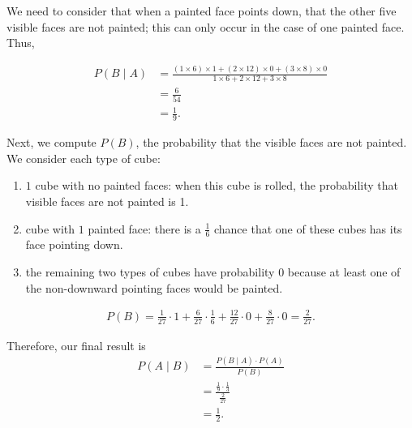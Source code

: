 \documentclass{article}
\theoremstyle{mytheoremstyle}
\theoremstyle{mytheoremstyle}
\theoremstyle{myproblemstyle}
\begin{document}
    We need to consider that when a painted face points down, that the other
    five visible faces are not painted; this can only occur in the case of one painted
    face. Thus,

    \begin{align*}
      P(B \mid A) &= \frac{(1\times 6) \times 1 + (2 \times 12) \times 0 + (3
      \times 8) \times  0}{1\times 6 + 2\times 12 + 3\times 8} \\
        &= \frac{6}{54} \\
        &= \frac{1}{9}.
    \end{align*}

    Next, we compute \( P (B) \), the probability that the visible faces are
    not painted. We consider each type of cube:

    \begin{enumerate}
      \item \( 1 \) cube with no painted faces: when this cube is rolled, the
        probability that visible faces are not painted is 1.
      \item cube with \( 1 \) painted face: there is a \( \frac{1}{6} \) chance
        that one of these cubes has its face pointing down.
      \item the remaining two types of cubes have probability \( 0 \) because
        at least one of the non-downward pointing faces would be painted.
    \end{enumerate}

    \begin{align*}
      P(B) = \frac{1}{27} \cdot 1 + \frac{6}{27} \cdot \frac{1}{6} +
      \frac{12}{27}\cdot 0 + \frac{8}{27} \cdot 0 = \frac{2}{27}.
    \end{align*}

    Therefore, our final result is
    \begin{align*}
      P(A \mid B) &= \frac{P(B \mid A) \cdot P(A)}{P(B)} \\
                  &= \frac{\frac{1}{9} \cdot \frac{1}{3}}{\frac{2}{27}}  \\
                  &= \frac{1}{2}.
    \end{align*}
\end{document}
